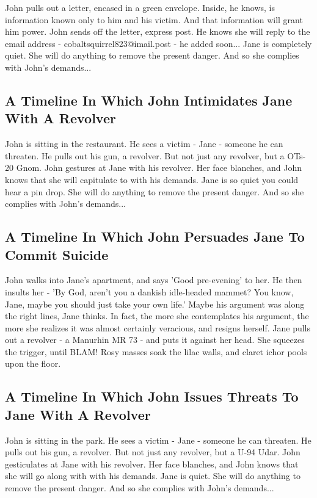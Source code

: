 \documentclass{article}
\begin{document}
John pulls out a letter, encased in a green envelope. Inside, he knows, is information known only to him and his victim. And that information will grant him power.
John sends off the letter, express post. He knows she will reply to the email address {-} cobaltsquirrel823@imail.post {-} he added soon...
Jane is completely quiet. She will do anything to remove the present danger. And so she complies with John's demands...
\subsection{A Timeline In Which John Intimidates Jane With A Revolver}


John is sitting in the restaurant.
He sees a victim {-} Jane {-} someone he can threaten. He pulls out his gun, a revolver.
But not just any revolver, but a OTs{-}20 Gnom.
John gestures at Jane with his revolver. Her face blanches, and John knows that she will capitulate to with his demands.
Jane is so quiet you could hear a pin drop. She will do anything to remove the present danger. And so she complies with John's demands...
\subsection{A Timeline In Which John Persuades Jane To Commit Suicide}


John walks into Jane's apartment, and says 'Good pre{-}evening' to her.
He then insults her {-} 'By God, aren't you a dankish idle{-}headed mammet?
You know, Jane, maybe you should just take your own life.'
Maybe his argument was along the right lines, Jane thinks.
In fact, the more she contemplates his argument, the more she realizes it was almost certainly veracious, and resigns herself.
Jane pulls out a revolver {-} a Manurhin MR 73 {-} and puts it against her head.
She squeezes the trigger, until BLAM!
Rosy masses soak the lilac walls, and claret ichor pools upon the floor.
\subsection{A Timeline In Which John Issues Threats To Jane With A Revolver}


John is sitting in the park.
He sees a victim {-} Jane {-} someone he can threaten. He pulls out his gun, a revolver.
But not just any revolver, but a U{-}94 Udar.
John gesticulates at Jane with his revolver. Her face blanches, and John knows that she will go along with with his demands.
Jane is quiet. She will do anything to remove the present danger. And so she complies with John's demands...
\end{document}
